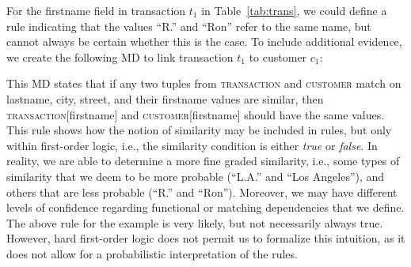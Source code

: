 For the \textsf{firstname} field in transaction $t_1$ in Table~\ref{tab:trans}, we could define a rule indicating that the values ``R.'' and ``Ron'' refer to the same name, but cannot always be certain whether this is the case. To include additional evidence, we create the following MD to link transaction $t_1$ to customer $c_1$:\\ 
\vspace*{-0.5cm}
\begin{table}[h]\footnotesize
\scriptsize
\centering
{}
\end{table}
\vspace*{-0.5cm}

This MD states that if any two tuples from \textsc{transaction} and \textsc{customer} match on \textsf{lastname}, \textsf{city}, \textsf{street}, and their \textsf{firstname} values are similar, then \textsc{transaction}[\textsf{firstname}] and \textsc{customer}[\textsf{firstname}] should have the same values. This rule shows how the notion of similarity may be included in rules, but only within first-order logic, i.e., the similarity condition is either \emph{true} or \emph{false}. In reality, we are able to determine a more fine graded similarity, i.e., some types of similarity that we deem to be more probable (``L.A.'' and ``Los Angeles''), and others that are less probable (``R.'' and ``Ron''). Moreover, we may have different levels of confidence regarding functional or matching dependencies that we define. The above rule for the example is very likely, but not necessarily always true. However, hard first-order logic does not permit us to formalize this intuition, as it does not allow for a probabilistic interpretation of the rules.